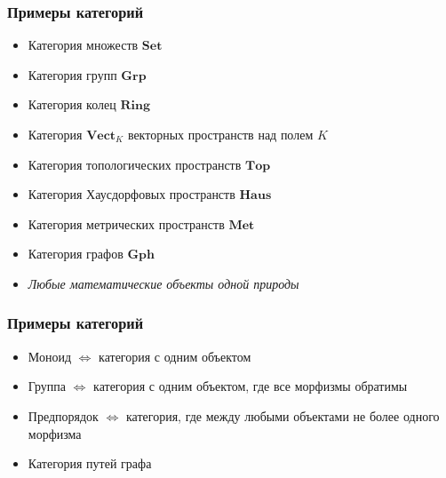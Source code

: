 \documentclass{beamer}
\begin{document}
\begin{frame}
\frametitle{Примеры категорий}
\begin{itemize}
\pause
\item Категория множеств \begin{math}\mathbf{Set}\end{math}
\pause
\item Категория групп \begin{math}\mathbf{Grp}\end{math}
\pause
\item Категория колец \begin{math}\mathbf{Ring}\end{math}
\pause
\item Категория \begin{math}\mathbf{Vect}_K\end{math} векторных пространств над полем \begin{math}K\end{math}
\pause
\item Категория топологических пространств \begin{math}\mathbf{Top}\end{math}
\pause
\item Категория Хаусдорфовых пространств \begin{math}\mathbf{Haus}\end{math}
\pause
\item Категория метрических пространств \begin{math}\mathbf{Met}\end{math}
\pause
\item Категория графов \begin{math}\mathbf{Gph}\end{math}
\pause
\item \textit{Любые математические объекты одной природы}
\end{itemize}
\end{frame}

\begin{frame}
\frametitle{Примеры категорий}
\begin{itemize}
\pause
\item Моноид \begin{math}\Leftrightarrow\end{math} категория с одним объектом
\item Группа \begin{math}\Leftrightarrow\end{math} категория с одним объектом, где все морфизмы обратимы
\item Предпорядок \begin{math}\Leftrightarrow\end{math} категория, где между любыми объектами не более одного морфизма
\item Категория путей графа
\end{itemize}
\end{frame}
\end{document}
